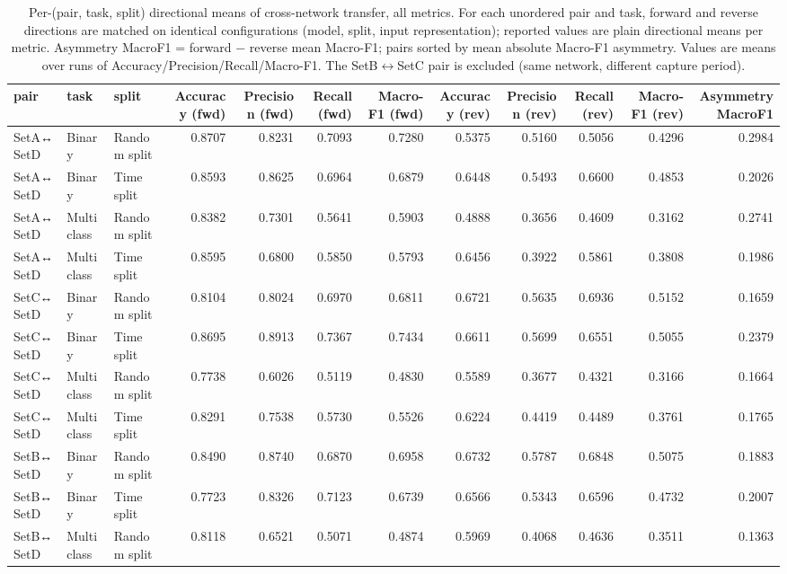 \begin{table}
\caption{Per-(pair, task, split) directional means of cross-network transfer, all metrics. For each unordered pair and task, forward and reverse directions are matched on identical configurations (model, split, input representation); reported values are plain directional means per metric. Asymmetry MacroF1 = forward $-$ reverse mean Macro-F1; pairs sorted by mean absolute Macro-F1 asymmetry. Values are means over runs of Accuracy/Precision/Recall/Macro-F1. The SetB$\leftrightarrow$SetC pair is excluded (same network, different capture period).}
\label{tab:q4_appendix_pair_task_split}
\begin{tabular}{lllrrrrrrrrr}
\toprule
pair & task & split & Accuracy (fwd) & Precision (fwd) & Recall (fwd) & Macro-F1 (fwd) & Accuracy (rev) & Precision (rev) & Recall (rev) & Macro-F1 (rev) & Asymmetry MacroF1 \\
\midrule
SetA↔SetD & Binary & Random split & 0.8707 & 0.8231 & 0.7093 & 0.7280 & 0.5375 & 0.5160 & 0.5056 & 0.4296 & 0.2984 \\
SetA↔SetD & Binary & Time split & 0.8593 & 0.8625 & 0.6964 & 0.6879 & 0.6448 & 0.5493 & 0.6600 & 0.4853 & 0.2026 \\
SetA↔SetD & Multiclass & Random split & 0.8382 & 0.7301 & 0.5641 & 0.5903 & 0.4888 & 0.3656 & 0.4609 & 0.3162 & 0.2741 \\
SetA↔SetD & Multiclass & Time split & 0.8595 & 0.6800 & 0.5850 & 0.5793 & 0.6456 & 0.3922 & 0.5861 & 0.3808 & 0.1986 \\
SetC↔SetD & Binary & Random split & 0.8104 & 0.8024 & 0.6970 & 0.6811 & 0.6721 & 0.5635 & 0.6936 & 0.5152 & 0.1659 \\
SetC↔SetD & Binary & Time split & 0.8695 & 0.8913 & 0.7367 & 0.7434 & 0.6611 & 0.5699 & 0.6551 & 0.5055 & 0.2379 \\
SetC↔SetD & Multiclass & Random split & 0.7738 & 0.6026 & 0.5119 & 0.4830 & 0.5589 & 0.3677 & 0.4321 & 0.3166 & 0.1664 \\
SetC↔SetD & Multiclass & Time split & 0.8291 & 0.7538 & 0.5730 & 0.5526 & 0.6224 & 0.4419 & 0.4489 & 0.3761 & 0.1765 \\
SetB↔SetD & Binary & Random split & 0.8490 & 0.8740 & 0.6870 & 0.6958 & 0.6732 & 0.5787 & 0.6848 & 0.5075 & 0.1883 \\
SetB↔SetD & Binary & Time split & 0.7723 & 0.8326 & 0.7123 & 0.6739 & 0.6566 & 0.5343 & 0.6596 & 0.4732 & 0.2007 \\
SetB↔SetD & Multiclass & Random split & 0.8118 & 0.6521 & 0.5071 & 0.4874 & 0.5969 & 0.4068 & 0.4636 & 0.3511 & 0.1363 \\

\end{tabular}
\end{table}
